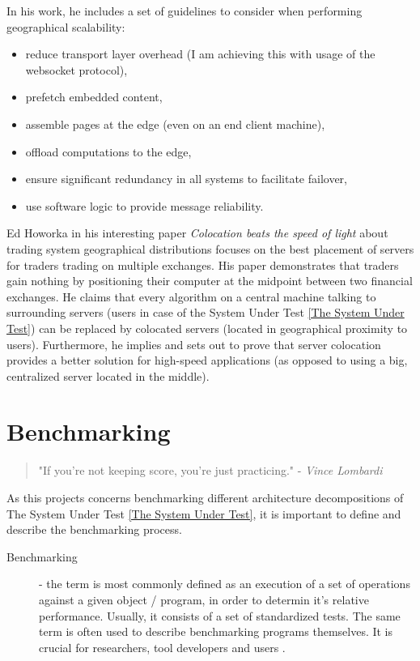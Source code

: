 \documentclass{uvamscse}
\begin{document}
In his work, he includes a set of guidelines to consider when performing geographical scalability:
\begin{itemize}
  \item reduce transport layer overhead (I am achieving this with usage of the websocket protocol),
  \item prefetch embedded content,
  \item assemble pages at the edge (even on an end client machine),
  \item offload computations to the edge,
  \item ensure significant redundancy in all systems to facilitate failover,
  \item use software logic to provide message reliability.
\end{itemize}

Ed Howorka in his interesting paper \textit{Colocation beats the speed of light} \cite{EdHoColoc}  about trading system geographical distributions focuses on the best placement of servers for traders trading on multiple exchanges. His paper demonstrates that traders gain nothing by positioning their computer at the midpoint between two financial exchanges. He claims that  every algorithm on a central machine talking to surrounding servers (users in case of the System Under Test \ref{The System Under Test}) can be replaced by colocated servers (located in geographical proximity to users). Furthermore, he implies and sets out to prove that server colocation provides a better solution for high-speed applications (as opposed to using a big, centralized server located in the middle).

\section{Benchmarking}

\begin{quote}
"If you're not keeping score, you're just practicing." - \textit{Vince Lombardi}
\end{quote}

As this projects concerns benchmarking different architecture decompositions of The System Under Test \ref{The System Under Test}, it is important to define and describe the benchmarking process.

\begin{description}
  \item[Benchmarking]
  - the term is most commonly defined as an execution of a set of operations against a given object / program, in order to determin it's relative performance. Usually, it consists of a set of standardized tests. The same term is often used to describe benchmarking programs themselves. It is crucial for researchers, tool developers and users \cite{BenRM}.
\end{description}
\end{document}
